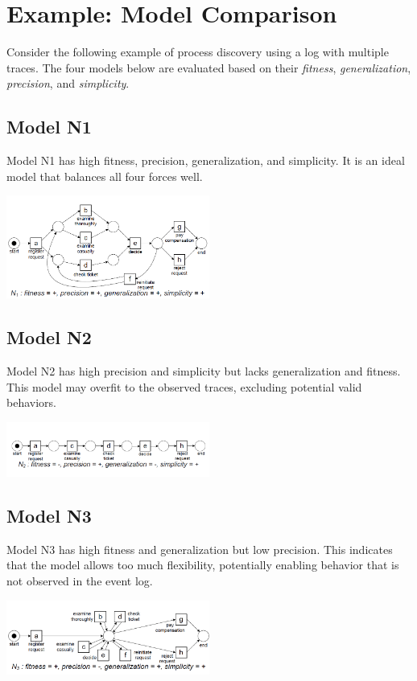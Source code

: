     
    \section{Example: Model Comparison}
    
    Consider the following example of process discovery using a log with multiple traces. The four models below are evaluated based on their \textit{fitness}, \textit{generalization}, \textit{precision}, and \textit{simplicity}.
    
    
    \subsection{Model N1}
    Model N1 has high fitness, precision, generalization, and simplicity. It is an ideal model that balances all four forces well.
    \begin{center}
        \includegraphics[width=0.5\textwidth]{capitolo 5/5 n1.png} %
    \end{center}
    \subsection{Model N2}
    Model N2 has high precision and simplicity but lacks generalization and fitness. This model may overfit to the observed traces, excluding potential valid behaviors.
    \begin{center}
        \includegraphics[width=0.5\textwidth]{capitolo 5/5 n2.png} %
    \end{center}
    \subsection{Model N3}
    Model N3 has high fitness and generalization but low precision. This indicates that the model allows too much flexibility, potentially enabling behavior that is not observed in the event log.
    \begin{center}
        \includegraphics[width=0.5\textwidth]{capitolo 5/5 n3.png} %
    \end{center}
